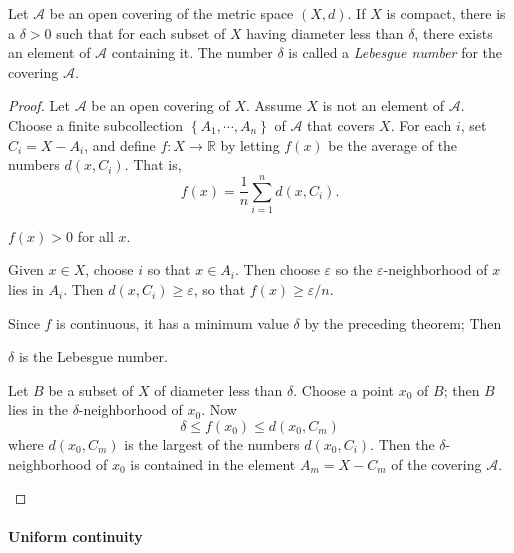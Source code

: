 \begin{theorem}
  Let \( \mathcal{A} \) be an open covering of the metric space \( (X, d) \).
  If \( X \) is compact, there is a \( \delta > 0 \) such that for each subset of \( X \) having diameter less than \( \delta \), there exists an element of \( \mathcal{A} \) containing it.
  The number \( \delta \) is called a \emph{Lebesgue number} for the covering \( \mathcal{A} \).
\end{theorem}
\begin{proof}
  Let \( \mathcal{A} \) be an open covering of \( X \).
  Assume \( X \) is not an element of \( \mathcal{A} \).
  Choose a finite subcollection \( \left\lbrace A_1, \cdots, A_n \right\rbrace \) of \( \mathcal{A} \) that covers \( X \).
  For each \( i \), set \( C_i = X - A_i \), and define \( f: X \to \mathbb{R} \) by letting \( f(x) \) be the average of the numbers \( d(x, C_i) \).
  That is,
  \[
    f(x) = \frac{1}{n} \sum_{i = 1}^n d(x, C_i).
  \]
  \begin{claim}
     \( f(x) > 0 \) for all \( x \).
  \end{claim}
  \begin{claimproof}
    Given \( x \in X \), choose \( i \) so that \( x \in A_i \).
    Then choose \( \varepsilon \) so the \( \varepsilon \)-neighborhood of \( x \) lies in \( A_i \).
    Then \( d(x, C_i) \geq \varepsilon \), so that \( f(x) \geq \varepsilon / n \).
  \end{claimproof}
  Since \( f \) is continuous, it has a minimum value \( \delta \) by the preceding theorem; Then
  \begin{claim}
    \( \delta \) is the Lebesgue number.
  \end{claim}
  \begin{claimproof}
    Let \( B \) be a subset of \( X \) of diameter less than \( \delta \).
    Choose a point \( x_0 \) of \( B \);
    then \( B \) lies in the \( \delta \)-neighborhood of \( x_0 \).
    Now
    \[
      \delta \leq f(x_0) \leq d(x_0, C_m)
    \]
    where \( d(x_0, C_m) \) is the largest of the numbers \( d(x_0, C_i) \).
    Then the \( \delta \)-neighborhood of \( x_0 \) is contained in the element \( A_m = X - C_m \) of the covering \( \mathcal{A} \).
  \end{claimproof}
\end{proof}

\paragraph{Uniform continuity}

